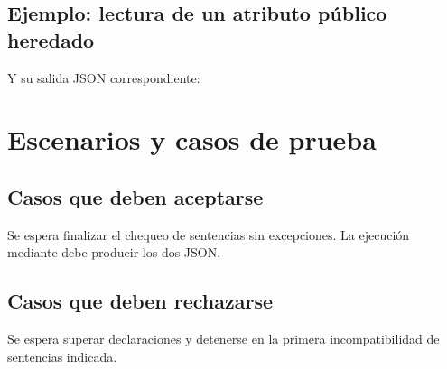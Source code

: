 \clearpage
\subsection{Ejemplo: lectura de un atributo público heredado}


Y su salida JSON correspondiente:


\clearpage
\section{Escenarios y casos de prueba}
\label{sec:casos-sentencias}

\subsection{Casos que deben aceptarse}
Se espera finalizar el chequeo de sentencias sin excepciones.
La ejecución mediante  debe producir los dos JSON.


\subsection{Casos que deben rechazarse}
Se espera superar declaraciones y detenerse en la primera incompatibilidad
de sentencias indicada.

\endgroup
